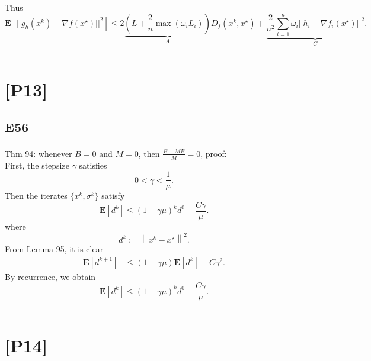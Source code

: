 \documentclass[12pt]{article}
\begin{document}
Thus
\begin{equation*}
    \mathbf{E}\left[||g_h(x^k) - \nabla f(x^\star) ||^2\right] \leq 2 \underbrace{(L + \frac{2}{n}\max(\omega_i L_i))}_{A}D_f(x^k, x^\star) + \underbrace{\frac{2}{n^2}\sum_{i=1}^n \omega_i ||h_i - \nabla f_i(x^\star)||^2}_{C}.
\end{equation*}

\hrule
\vspace{0.1cm}
\section*{[P13]}
\subsection*{E56}
Thm 94: whenever $B=0$ and $M=0$, then $\frac{B+M\tilde{B}}{M} = 0$, proof:\\
First, the stepsize $\gamma$ satisfies
\begin{equation}
    0 < \gamma < \frac{1}{\mu}.
    \label{eq:94gamma}
\end{equation}
Then the iterates $\{x^k, \sigma^k\}$ satisfy
\begin{equation}
    \mathbf{E}[d^k] \leq (1-\gamma\mu)^k d^0 + \frac{C\gamma}{\mu}.
    \label{eq:94iterate}
\end{equation}
where
\begin{equation}
    d^k := \left\| x^k - x^\star \right\|^2.
\end{equation}
From Lemma 95, it is clear
\begin{equation*}
    \begin{split}
        \mathbf{E}[d^{k+1}] &\leq (1-\gamma\mu)\mathbf{E}[d^k] + C\gamma^2.
    \end{split}
\end{equation*}
By recurrence, we obtain
\begin{equation*}
    \mathbf{E}[d^{k}] \leq (1-\gamma\mu)^k d^0 + \frac{C\gamma}{\mu}.
\end{equation*}

\hrule
\vspace{0.1cm}
\section*{[P14]}
\end{document}
